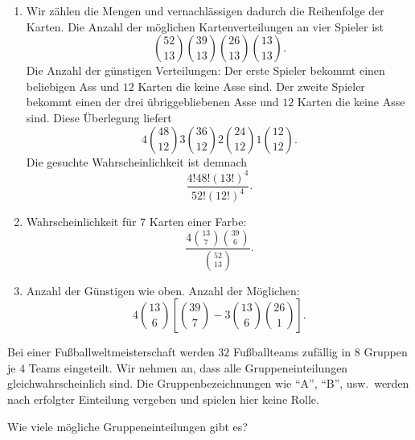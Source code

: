 \solution 
\begin{enumerate}
    \item Wir zählen die Mengen und vernachlässigen dadurch die Reihenfolge der Karten.
        Die Anzahl der möglichen Kartenverteilungen an vier Spieler ist 
        \begin{equation*}
            \binom{52}{13}\binom{39}{13}\binom{26}{13}\binom{13}{13}.
        \end{equation*}
        Die Anzahl der günstigen Verteilungen: Der erste Spieler bekommt einen beliebigen
        Ass und $12$ Karten die keine Asse sind. Der zweite Spieler bekommt einen der drei
        übriggebliebenen Asse und $12$ Karten die keine Asse sind. Diese Überlegung liefert
        \begin{equation*}
            4 \binom{48}{12} 3 \binom{36}{12} 2 \binom{24}{12} 1 \binom{12}{12}.
        \end{equation*}
        Die gesuchte Wahrscheinlichkeit ist demnach
        \begin{equation*}
            \frac{4! 48!  \left( 13! \right)^4}{ 52! \left( 12! \right)^4 }. 
        \end{equation*}
    \item Wahrscheinlichkeit für $7$ Karten einer Farbe:
        \begin{equation*}
            \frac{4 \binom{13}{7} \binom{39}{6}}{ \binom{52}{13}}.
        \end{equation*}
    \item Anzahl der Günstigen wie oben. Anzahl der Möglichen:
        \begin{equation*}
            4 \binom{13}{6} \left[ \binom{39}{7} - 3 \binom{13}{6} \binom{26}{1}  \right].
        \end{equation*}
\end{enumerate}

 Bei einer Fußballweltmeisterschaft
werden $32$ Fußballteams zufällig in $8$ Gruppen je $4$ Teams eingeteilt.  Wir
nehmen an, dass alle Gruppeneinteilungen gleichwahrscheinlich sind.  Die
Gruppenbezeichnungen wie "`A"', "`B"', usw.\ werden nach erfolgter Einteilung
vergeben und spielen hier keine Rolle.

        Wie viele mögliche Gruppeneinteilungen gibt es?

